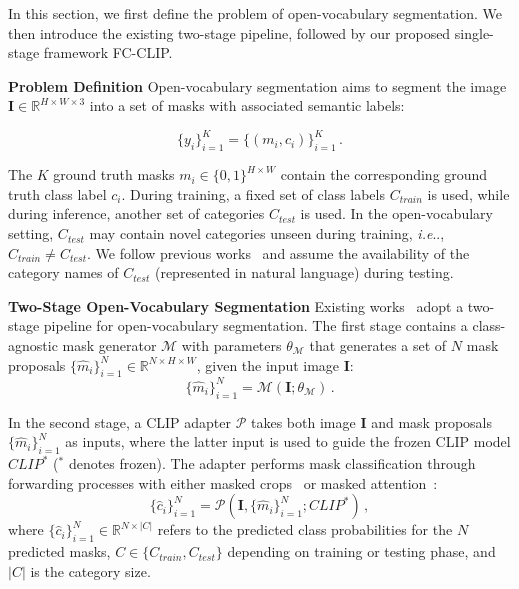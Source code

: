 \documentclass{article}
\makeatletter
\DeclareRobustCommand\onedot{\futurelet\@let@token\@onedot}
\def\@onedot{\ifx\@let@token.\else.\null\fi\xspace}
\def\ie{\emph{i.e}\onedot}
\newcommand{\modelname}{FC-CLIP\xspace}
\makeatother
\begin{document}
In this section, we first define the problem of open-vocabulary segmentation.
We then introduce the existing two-stage pipeline, followed by our proposed single-stage framework \modelname.


\noindent \textbf{Problem Definition}\quad
Open-vocabulary segmentation aims to segment the image $\mathbf{I} \in \mathbb{R}^{H \times W \times 3}$ into 
a set of masks with associated semantic labels:

\begin{equation}
\{y_i\}_{i=1}^K = \{(m_i, c_i)\}_{i=1}^K \,.
\end{equation}

The $K$ ground truth masks $m_i \in {\{0,1\}}^{H \times W}$ contain the corresponding ground truth class label $c_i$.
During training, a fixed set of class labels $C_{train}$ is used, while during inference, another set of categories $C_{test}$ is used.
In the open-vocabulary setting, $C_{test}$ may contain novel categories unseen during training, \ie, $C_{train}\neq C_{test}$.
We follow previous works~\cite{ding2022open, xu2023open} and assume the availability of the category names of $C_{test}$ (represented in natural language) during testing.

\noindent \textbf{Two-Stage Open-Vocabulary Segmentation}\quad
Existing works~\cite{xu2021simple, liang2022open, ding2022open, xu2023open} adopt a two-stage pipeline for open-vocabulary segmentation.
The first stage contains a class-agnostic mask generator $\mathcal{M}$ with parameters $\theta_{\mathcal{M}}$ that generates a set of $N$ mask proposals 
$\{\hat{m}_i\}_{i=1}^{N}\in\mathbb{R}^{N\times H\times W}$, given the input image $\mathbf{I}$:
\begin{equation}
\{\hat{m}_i\}_{i=1}^N = \mathcal{M}(\mathbf{I}; \theta_{\mathcal{M}}) \,.
\end{equation}

In the second stage, a CLIP adapter $\mathcal{P}$ takes both image $\mathbf{I}$ and mask proposals $\{\hat{m}_i\}_{i=1}^{N}$ as inputs, where the latter input is used to guide the frozen CLIP model $CLIP^*$ ($^*$ denotes frozen).
The adapter performs mask classification through forwarding processes with either masked crops~\cite{xu2021simple, liang2022open} or masked attention~\cite{ding2022open, xu2023open}:
\begin{equation}
\{\hat{c}_i\}_{i=1}^N = \mathcal{P}(\mathbf{I}, \{\hat{m}_i\}_{i=1}^N; CLIP^*) \,,
\end{equation}
where $\{\hat{c}_i\}_{i=1}^N\in\mathbb{R}^{N\times |C|}$ refers to the predicted class probabilities for the $N$ predicted masks, $C\in\{C_{train}, C_{test}\}$ depending on training or testing phase, and $|C|$ is the category size.
\end{document}
